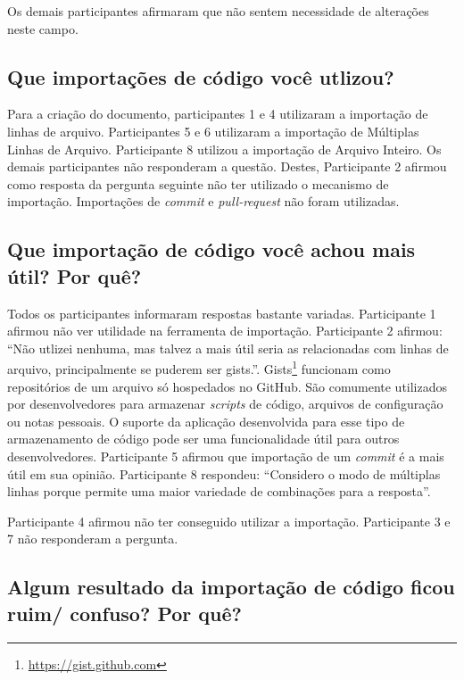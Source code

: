 Os demais participantes afirmaram que não sentem necessidade de alterações neste campo.

\subsection{Que importações de código você utlizou?}

Para a criação do documento, participantes 1 e 4 utilizaram a importação de linhas de arquivo. Participantes 5 e 6 utilizaram a importação de Múltiplas Linhas de Arquivo. Participante 8 utilizou a importação de Arquivo Inteiro. Os demais participantes não responderam a questão. Destes, Participante 2 afirmou como resposta da pergunta seguinte não ter utilizado o mecanismo de importação. Importações de \textit{commit} e \textit{pull-request} não foram utilizadas.

\subsection{Que importação de código você achou mais útil? Por quê?}

Todos os participantes informaram respostas bastante variadas. Participante 1 afirmou não ver utilidade na ferramenta de importação. Participante 2 afirmou: ``Não utlizei nenhuma, mas talvez a mais útil seria as relacionadas com linhas de arquivo, principalmente se puderem ser gists.''. Gists\footnote{\url{https://gist.github.com}} funcionam como repositórios de um arquivo só hospedados no GitHub. São comumente utilizados por desenvolvedores para armazenar \textit{scripts} de código, arquivos de configuração ou notas pessoais. O suporte da aplicação desenvolvida para esse tipo de armazenamento de código pode ser uma funcionalidade útil para outros desenvolvedores. Participante 5 afirmou que importação de um \textit{commit} é a mais útil em sua opinião. Participante 8 respondeu: ``Considero o modo de múltiplas linhas porque permite uma maior variedade de combinações para a resposta''.

Participante 4 afirmou não ter conseguido utilizar a importação. Participante 3 e 7 não responderam a pergunta.

\subsection{Algum resultado da importação de código ficou ruim/ confuso? Por quê?}

